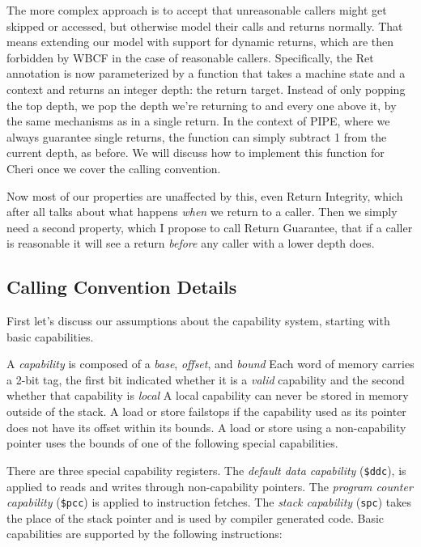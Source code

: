 \documentclass{article}
\begin{document}
The more complex approach is to accept that unreasonable callers might get skipped or
accessed, but otherwise model their calls and returns normally. That means extending
our model with support for dynamic returns, which are then forbidden by WBCF in the case
of reasonable callers. Specifically, the {\sc Ret} annotation is now parameterized by
a function that takes a machine state and a context and returns an integer depth: the
return target. Instead of only popping the top depth, we pop the depth
we're returning to and every one above it, by the same mechanisms as in a single return.
In the context of PIPE, where we always guarantee single returns, the function can simply
subtract 1 from the current depth, as before. We will discuss how to implement this
function for Cheri once we cover the calling convention.

Now most of our properties are unaffected by this, even Return Integrity, which after
all talks about what happens {\it when} we return to a caller. Then we simply need a second
property, which I propose to call Return Guarantee, that if a caller is reasonable it
will see a return {\it before} any caller with a lower depth does.

\subsection{Calling Convention Details}

First let's discuss our assumptions about the capability system, starting with basic
capabilities.

A {\em capability} is composed of a {\em base}, {\em offset}, and {\em bound}
Each word of memory carries a 2-bit tag, the first bit indicated whether it is a
{\em valid} capability and the second whether that capability is {\em local}
A local capability can never be stored in memory outside of the stack. A load or store
failstops if the capability used as its pointer does not have its offset within its
bounds. A load or store using a non-capability pointer uses the bounds of one of the
following special capabilities.

There are three special capability registers. The {\em default data capability} ({\tt \$ddc}),
is applied to reads and writes through non-capability pointers. The
{\em program counter capability} ({\tt \$pcc}) is applied to instruction fetches.
The {\em stack capability} ({\tt spc}) takes the place of the stack pointer and is used by
compiler generated code. Basic capabilities are supported by the following instructions:
\end{document}
